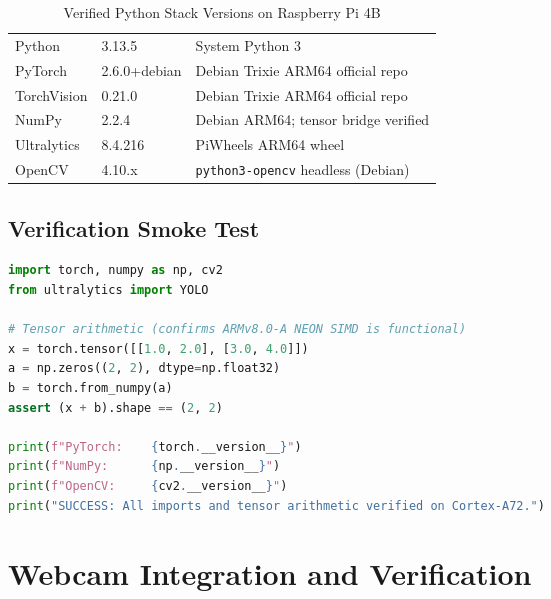 \documentclass[12pt,a4paper]{article}
\begin{document}
\renewcommand{\arraystretch}{1.30}
\begin{table}[H]
\centering
\caption{Verified Python Stack Versions on Raspberry Pi 4B}
\label{tab:pystack}
\small
\begin{tabularx}{\linewidth}{@{} L{3.5cm} L{3.0cm} X @{}}
\toprule
{} &  &  \\
\midrule
{}
Python       & 3.13.5          & System Python 3 \\
PyTorch      & 2.6.0+debian    & Debian Trixie ARM64 official repo \\
TorchVision  & 0.21.0          & Debian Trixie ARM64 official repo \\
NumPy        & 2.2.4           & Debian ARM64; tensor bridge verified \\
Ultralytics  & 8.4.216         & PiWheels ARM64 wheel \\
OpenCV       & 4.10.x          & \texttt{python3-opencv} headless (Debian) \\
\bottomrule
\end{tabularx}
\end{table}

\subsection{Verification Smoke Test}

\begin{lstlisting}[language=python, caption={CPU tensor and import verification on Cortex-A72}]
import torch, numpy as np, cv2
from ultralytics import YOLO

# Tensor arithmetic (confirms ARMv8.0-A NEON SIMD is functional)
x = torch.tensor([[1.0, 2.0], [3.0, 4.0]])
a = np.zeros((2, 2), dtype=np.float32)
b = torch.from_numpy(a)
assert (x + b).shape == (2, 2)

print(f"PyTorch:    {torch.__version__}")
print(f"NumPy:      {np.__version__}")
print(f"OpenCV:     {cv2.__version__}")
print("SUCCESS: All imports and tensor arithmetic verified on Cortex-A72.")
\end{lstlisting}

\clearpage

\section{Webcam Integration and Verification}
\end{document}
